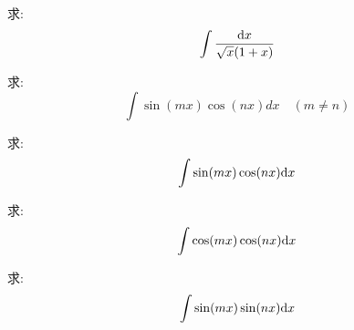 \begin{example}
    求:
    \begin{equation}
        \int \frac{\mathrm{d} x}{\sqrt{x}(1+x)}
    \end{equation}
\end{example}
\begin{solution}
    
\end{solution}

\begin{example}
    求:
    \begin{equation}
        \int \sin(mx)\cos(nx) dx \quad (m \neq n)
    \end{equation}
\end{example}
\begin{solution}
    
\end{solution}

\begin{example}
    求:
    \begin{equation}
        \int \sin(mx) \cos(nx) \mathrm{d} x
    \end{equation}
\end{example}
\begin{solution}
    
\end{solution}

\begin{example}
    求:
    \begin{equation}
        \int \cos(mx) \cos(nx) \mathrm{d} x
    \end{equation}
\end{example}
\begin{solution}
    
\end{solution}

\begin{example}
    求:
    \begin{equation}
        \int \sin(mx) \sin(nx) \mathrm{d} x
    \end{equation}
\end{example}
\begin{solution}
    
\end{solution}

